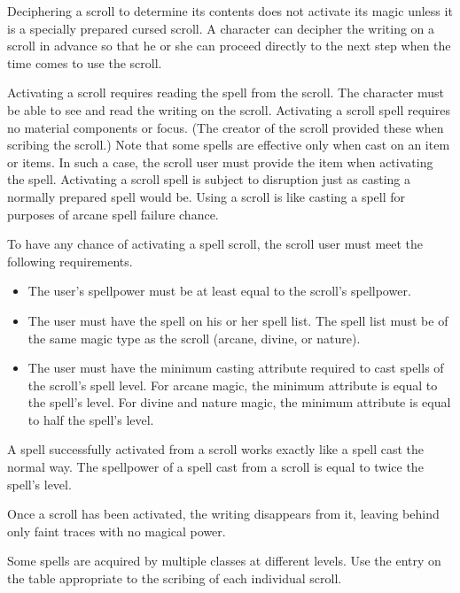         Deciphering a scroll to determine its contents does not activate its magic unless it is a specially prepared cursed scroll.
        A character can decipher the writing on a scroll in advance so that he or she can proceed directly to the next step when the time comes to use the scroll.

         Activating a scroll requires reading the spell from the scroll.
        The character must be able to see and read the writing on the scroll.
        Activating a scroll spell requires no material components or focus.
        (The creator of the scroll provided these when scribing the scroll.) Note that some spells are effective only when cast on an item or items.
        In such a case, the scroll user must provide the item when activating the spell.
        Activating a scroll spell is subject to disruption just as casting a normally prepared spell would be.
        Using a scroll is like casting a spell for purposes of arcane spell failure chance.

        To have any chance of activating a spell scroll, the scroll user must meet the following requirements.
        \begin{itemize}
            \item The user's spellpower must be at least equal to the scroll's spellpower.
            \item The user must have the spell on his or her spell list.
                The spell list must be of the same magic type as the scroll (arcane, divine, or nature).
            \item The user must have the minimum casting attribute required to cast spells of the scroll's spell level.
                For arcane magic, the minimum attribute is equal to the spell's level.
                For divine and nature magic, the minimum attribute is equal to half the spell's level.
        \end{itemize}

         A spell successfully activated from a scroll works exactly like a spell cast the normal way.
        The spellpower of a spell cast from a scroll is equal to twice the spell's level.

        Once a scroll has been activated, the writing disappears from it, leaving behind only faint traces with no magical power.

         Some spells are acquired by multiple classes at different levels.
        Use the entry on the table appropriate to the scribing of each individual scroll.

